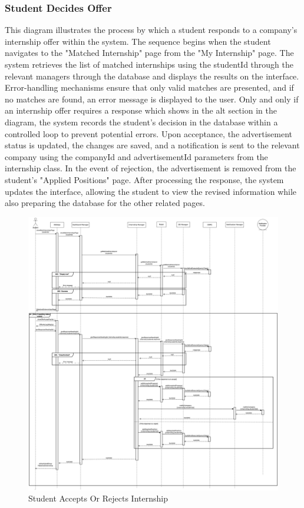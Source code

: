 \documentclass[a4paper,12pt]{article}
\begin{document}
\subsubsection*{Student Decides Offer}
This diagram illustrates the process by which a student responds to a company’s internship offer within the system. The sequence begins when the student navigates to the "Matched Internship" page from the "My Internship" page. The system retrieves the list of matched internships using the studentId through the relevant managers through the database and displays the results on the interface. Error-handling mechanisms ensure that only valid matches are presented, and if no matches are found, an error message is displayed to the user.
Only and only if an internship offer requires a response which shows in the alt section in the diagram, the system records the student’s decision in the database within a controlled loop to prevent potential errors. Upon acceptance, the advertisement status is updated, the changes are saved, and a notification is sent to the relevant company using the companyId and advertisementId parameters from the internship class. In the event of rejection, the advertisement is removed from the student's "Applied Positions" page. After processing the response, the system updates the interface, allowing the student to view the revised information while also preparing the database for the other related pages.
\begin{figure}[H]
\centering
\includegraphics[scale = 0.15]{DD_figures/RuntimeView/studentConfirmCompany.drawio.png}
\caption{Student Accepts Or Rejects Internship}
\end{figure}
\newpage
\end{document}
